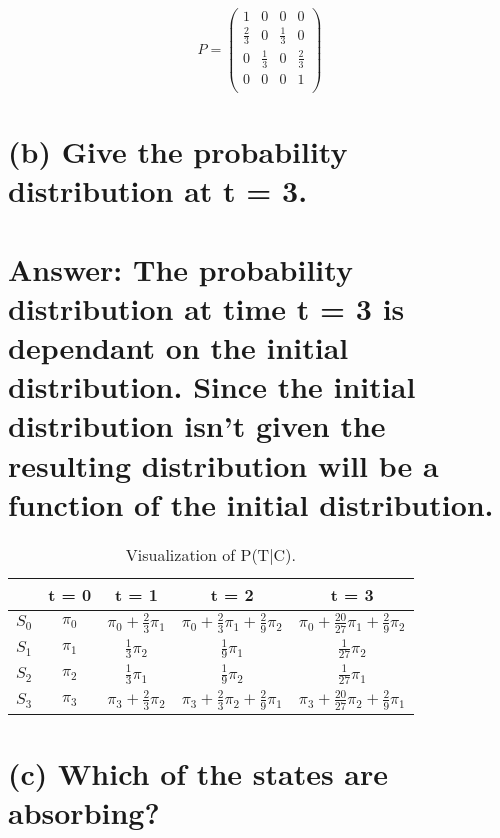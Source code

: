 \documentclass[11px]{article}
\begin{document}
\begin{equation}
P = \begin{pmatrix}
1 & 0 & 0 & 0 \\
\frac{2}{3} & 0 & \frac{1}{3} & 0 \\
0 & \frac{1}{3} & 0 & \frac{2}{3} \\
0 & 0 & 0 & 1 \\
\end{pmatrix}
\end{equation}

\section*{\normalfont (b) Give the probability distribution at t = 3.}

\section*{Answer: The probability distribution at time t = 3 is dependant on the initial distribution. Since the initial distribution isn't given the resulting distribution will be a function of the initial distribution.}

\begin{table}[ht]
\centering
\begin{adjustbox}{width=1\linewidth}
\begin{tabular}{c|cccc}
 & t = 0 & t = 1 & t = 2 & t = 3\\ \hline
$S_0$ & $\pi_0$ & $\pi_0 + \frac{2}{3}\pi_1$ & $\pi_0 + \frac{2}{3}\pi_1 + \frac{2}{9}\pi_2$ & $\pi_0 + \frac{20}{27}\pi_1 + \frac{2}{9}\pi_2$\\ 
$S_1$ & $\pi_1$ & $\frac{1}{3}\pi_2$ & $\frac{1}{9}\pi_1$ & $\frac{1}{27}\pi_2$ \\ 
$S_2$ & $\pi_2$ & $\frac{1}{3}\pi_1$ & $\frac{1}{9}\pi_2$ & $\frac{1}{27}\pi_1$ \\ 
$S_3$ & $\pi_3$ & $\pi_3 + \frac{2}{3}\pi_2$ & $\pi_3 + \frac{2}{3}\pi_2 + \frac{2}{9} \pi_1$ & $\pi_3 + \frac{20}{27}\pi_2 + \frac{2}{9}\pi_1$ \\ 
\end{tabular}
\end{adjustbox}
\caption{Visualization of P(T|C). } 
\end{table}

\section*{\normalfont (c) Which of the states are absorbing?}
\end{document}
